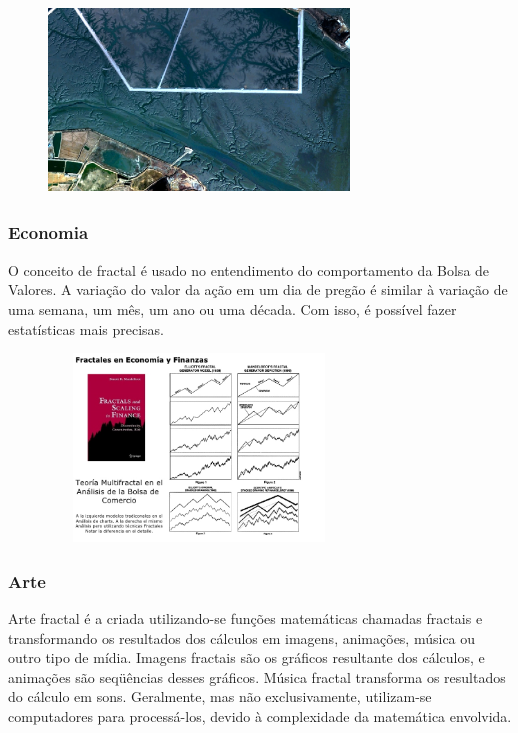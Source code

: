 \documentclass{beamer}
\begin{document}
\begin{frame}
	\begin{figure}[htb]
	\centering
    	    \includegraphics[width=8cm, height=5cm]{images/geo1.jpg}
       	        \vspace{0.01em}
	\end{figure}
\end{frame}
\begin{frame}
\frametitle{Economia}
O conceito de fractal é usado no entendimento do comportamento da Bolsa de Valores. A variação do valor da ação em um dia de pregão é similar à variação de uma semana, um mês, um ano ou uma década. Com isso, é possível fazer estatísticas mais precisas.
\end{frame}
\begin{frame}
	\begin{figure}[htb]
	\centering
    	    \includegraphics[width=8cm, height=5cm]{images/eco1.jpg}
       	        \vspace{0.01em}
	\end{figure}
\end{frame}
\begin{frame}
\frametitle{Arte}
Arte fractal é a criada utilizando-se funções matemáticas chamadas fractais e transformando os resultados dos cálculos em imagens, animações, música ou outro tipo de mídia. Imagens fractais são os gráficos resultante dos cálculos, e animações são seqüências desses gráficos. Música fractal transforma os resultados do cálculo em sons. Geralmente, mas não exclusivamente, utilizam-se computadores para processá-los, devido à complexidade da matemática envolvida. 
\end{frame}
\end{document}
